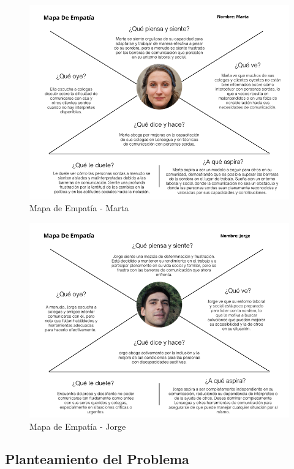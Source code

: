 \begin{figure} [H]
    \centering
    \includegraphics[width=0.9\linewidth]{figuras/mapa_empatia_marta.png}
    \caption{Mapa de Empatía - Marta}
    \label{fig:enter-label}
\end{figure}


\begin{figure} [H]
    \centering
    \includegraphics[width=0.9\linewidth]{figuras/mapa_empatia_jorge.png}
    \caption{Mapa de Empatía - Jorge}
    \label{fig:enter-label}
\end{figure}


\subsection{Planteamiento del Problema}

